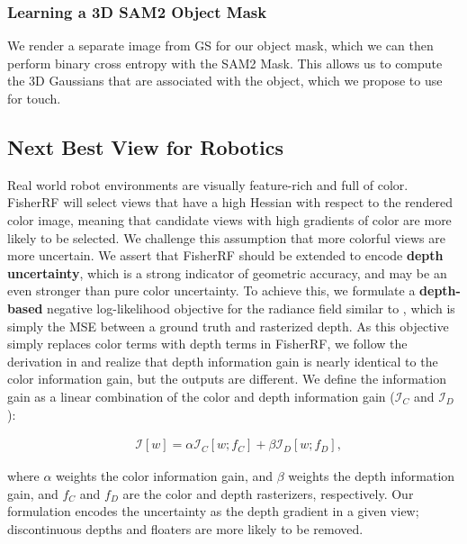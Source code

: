 \documentclass[letterpaper, 10 pt, conference]{ieeeconf}  %
\begin{document}
\subsubsection{Learning a 3D SAM2 Object Mask}

We render a separate image from GS for our object mask, which we can then perform binary cross entropy with the SAM2 Mask. This allows us to compute the 3D Gaussians that are associated with the object, which we propose to use for touch.


\subsection{Next Best View for Robotics}

Real world robot environments are visually feature-rich and full of color. FisherRF will select views that have a high Hessian with respect to the rendered color image, meaning that candidate views with high gradients of color are more likely to be selected. We challenge this assumption that more colorful views are more uncertain. We assert that FisherRF should be extended to encode \textbf{depth uncertainty}, which is a strong indicator of geometric accuracy, and may be an even stronger than pure color uncertainty. To achieve this, we formulate a\textbf{ depth-based} negative log-likelihood objective  for the radiance field similar to \cite{jiang2023fisherrf}, which is simply the MSE between a ground truth and rasterized depth.
As this objective simply replaces color terms with depth terms in FisherRF, we follow the derivation in \cite{jiang2023fisherrf} and realize that depth information gain is nearly identical to the color information gain, but the outputs are different. We  define the information gain as a linear combination of the color and depth information gain ($\mathcal{I}_C$ and $\mathcal{I}_D$):

\begin{equation}
    \begin{aligned}
        &\mathcal{I}[w] =  \alpha \mathcal{I}_C[w; f_C] + \beta \mathcal{I}_D[w; f_D],
    \end{aligned}
    \label{eq:fisher-combo}
\end{equation}

where $\alpha$ weights the color information gain, and $\beta$ weights the depth information gain, and $f_C$ and $f_D$ are the color and depth rasterizers, respectively. Our formulation encodes the uncertainty as the depth gradient in a given view; discontinuous depths  and floaters are more likely to be removed. 
\end{document}

